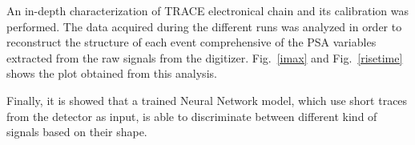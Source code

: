 An in-depth characterization of TRACE electronical chain and its calibration was performed. The data acquired during the different runs was analyzed in order to reconstruct the structure of each event comprehensive of the PSA variables extracted from the raw signals from the digitizer. Fig.~\ref{imax} and Fig.~\ref{risetime} shows the plot obtained from this analysis.

Finally, it is showed that a trained Neural Network model, which use short traces from the detector as input, is able to discriminate between different kind of signals based on their shape.
